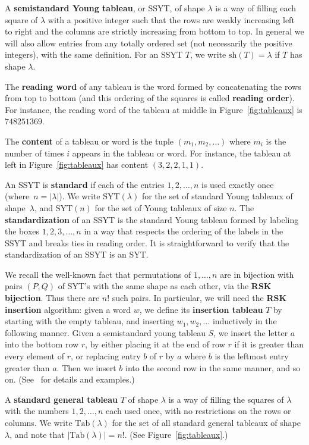 \documentclass[11pt]{article}
\theoremstyle{definition}
\numberwithin{equation}{section}
\newcommand{\SYT}{\mathrm{SYT}}
\newcommand{\sh}{\mathrm{sh}}
\newcommand{\Tab}{\mathrm{Tab}}
\begin{document}
A \textbf{semistandard Young tableau}, or SSYT, of shape $\lambda$ is a way of filling each square of $\lambda$ with a positive integer such that the rows are weakly increasing left to right and the columns are strictly increasing from bottom to top.  In general we will also allow entries from any totally ordered set (not necessarily the positive integers), with the same definition.   For an SSYT $T$, we write $\sh(T)=\lambda$ if $T$ has shape $\lambda$.


The \textbf{reading word} of any tableau is the word formed by concatenating the rows from top to bottom (and this ordering of the squares is called \textbf{reading order}).  For instance, the reading word of the tableau at middle in Figure~\ref{fig:tableaux} is $748251369$.

The \textbf{content} of a tableau or word is the tuple $(m_1,m_2,\ldots)$ where $m_i$ is the number of times $i$ appears in the tableau or word.  For instance, the tableau at left in Figure~\ref{fig:tableaux} has content $(3,2,2,1,1)$.


An SSYT is \textbf{standard} if each of the entries $1,2,\ldots,n$ is used exactly once (where~$n=|\lambda|$).  We write $\SYT(\lambda)$ for the set of standard Young tableaux of shape~$\lambda$, and $\SYT(n)$ for the set of Young tableaux of size $n$.  The \textbf{standardization} of an SSYT is the standard Young tableau formed by labeling the boxes $1,2,3,\ldots,n$ in a way that respects the ordering of the labels in the SSYT and breaks ties in reading order.  It is straightforward to verify that the standardization of an SSYT is an SYT.

We recall the well-known fact that permutations of $1,\ldots,n$ are in bijection with pairs $(P,Q)$ of SYT's with the same shape as each other, via the \textbf{RSK bijection}.  Thus there are $n!$ such pairs.  In particular, we will need the \textbf{RSK insertion} algorithm: given a word $w$, we define its \textbf{insertion tableau} $T$ by starting with the empty tableau, and inserting $w_1,w_2,\ldots$ inductively in the following manner.  Given a semistandard young tableau $S$, we insert the letter $a$ into the bottom row $r$, by either placing it at the end of row $r$ if it is greater than every element of $r$, or replacing entry $b$ of $r$ by $a$ where $b$ is the leftmost entry greater than $a$.  Then we insert $b$ into the second row in the same manner, and so on.  (See~\cite{Fulton} for details and examples.)

A \textbf{standard general tableau} $T$ of shape $\lambda$ is a way of filling the squares of $\lambda$ with the numbers $1,2,\ldots,n$ each used once, with no restrictions on the rows or columns.  We write $\Tab(\lambda)$ for the set of all standard general tableaux of shape $\lambda$, and note that $|\Tab(\lambda)|=n!$.  (See Figure~\ref{fig:tableaux}.)
\end{document}
